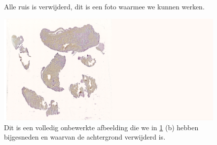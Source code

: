 \documentclass[a4paper,kulak]{kulakarticle}
\begin{document}
\begin{figure}[H]
	\centering
	\qquad
	
	\caption{Alle ruis is verwijderd, dit is een foto waarmee we kunnen werken.}
	\label{figuur ruisfilter}
\end{figure}

\begin{figure}[H]
	\centering
	\includegraphics[width=15.25cm]{Volledig_onbewerkt}
	
	\caption{Dit is een volledig onbewerkte afbeelding die we in \ref{figuur ruisfilter} (b) hebben bijgesneden en waarvan de achtergrond verwijderd is.}
	\label{figuur volledig_onbewerkt}
\end{figure}
\end{document}
